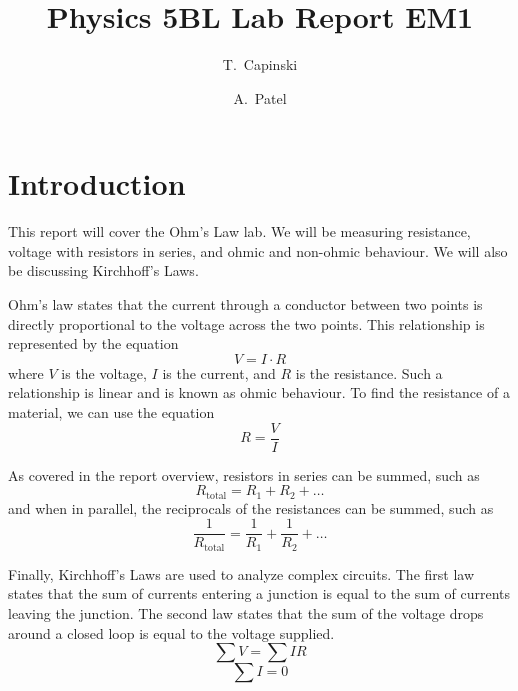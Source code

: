 \documentclass[11pt]{article}
\title{Physics 5BL Lab Report EM1}
\author{T.~Capinski \and A.~Patel}
\let\oldsection\section
\renewcommand\section{\clearpage\oldsection}
\begin{document}
    \maketitle
    \tableofcontents

    \section*{Introduction}\label{sec:introduction}

    This report will cover the Ohm's Law lab.
    We will be measuring resistance, voltage with resistors in series, and ohmic and non-ohmic behaviour.
    We will also be discussing Kirchhoff's Laws.

    Ohm's law states that the current through a conductor between two points is directly proportional to the voltage across the two points.
    This relationship is represented by the equation
    \begin{equation}\label{eq:ohm_equation}
        V = I \cdot R
    \end{equation}
    where $V$ is the voltage, $I$ is the current, and $R$ is the resistance.
    Such a relationship is linear and is known as ohmic behaviour.
    To find the resistance of a material, we can use the equation
    \begin{equation}\label{eq:resistance_equation}
        R = \frac{V}{I}
    \end{equation}

    As covered in the report overview, resistors in series can be summed, such as
    \begin{equation}\label{eq:resistors_in_series}
        R_{\text{total}} = R_1 + R_2 + \ldots
    \end{equation}
    and when in parallel, the reciprocals of the resistances can be summed, such as
    \begin{equation}\label{eq:resistors_in_parallel}
        \frac{1}{R_{\text{total}}} = \frac{1}{R_1} + \frac{1}{R_2} + \ldots
    \end{equation}

    Finally, Kirchhoff's Laws are used to analyze complex circuits.
    The first law states that the sum of currents entering a junction is equal to the sum of currents leaving the junction.
    The second law states that the sum of the voltage drops around a closed loop is equal to the voltage supplied.
    \begin{equation}\label{eq:kirchhoff}
        \sum V = \sum I R
    \end{equation}
    \begin{equation}\label{eq:kirchhoff2}
        \sum I = 0
    \end{equation}
\end{document}
